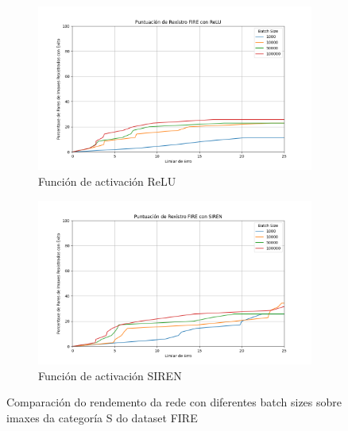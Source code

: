 \begin{figure}[tbp]
    \centering
    \begin{subfigure}[b]{0.5\textwidth}
        \centering
        \includegraphics[width=\textwidth]{imaxes/batchsize/fire_registration_scores_bs_relu_S.png}
        \caption{Función de activación ReLU}
        \label{fig:batch_size_comparison_relu}
    \end{subfigure}\hfill
    \begin{subfigure}[b]{0.5\textwidth}
        \centering
        \includegraphics[width=\textwidth]{imaxes/batchsize/fire_registration_scores_bs_siren_S.png}
        \caption{Función de activación SIREN}
        \label{fig:batch_size_comparison_siren}
    \end{subfigure}
    \caption{Comparación do rendemento da rede con diferentes batch sizes sobre imaxes da categoría S do dataset FIRE}
    \label{fig:batch_size_comparisons_fire}
\end{figure}



